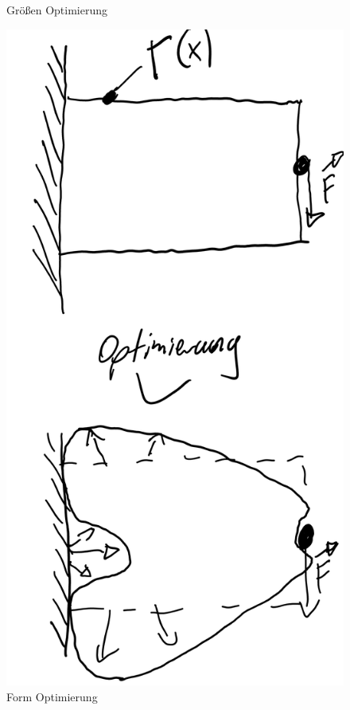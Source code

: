 \documentclass{article}
\begin{document}
\begin{figure}[htbp]
\begin{minipage}{0.2\textwidth}
            \caption{Gr\"o\ss{}en Optimierung}
          \end{minipage}\hfill
          \begin{minipage}{0.2\textwidth}
            \centering
            \includegraphics[width=\linewidth]{figures/Form-opt.png}
            \caption{Form Optimierung}

\end{minipage}
\end{figure}
\end{document}
